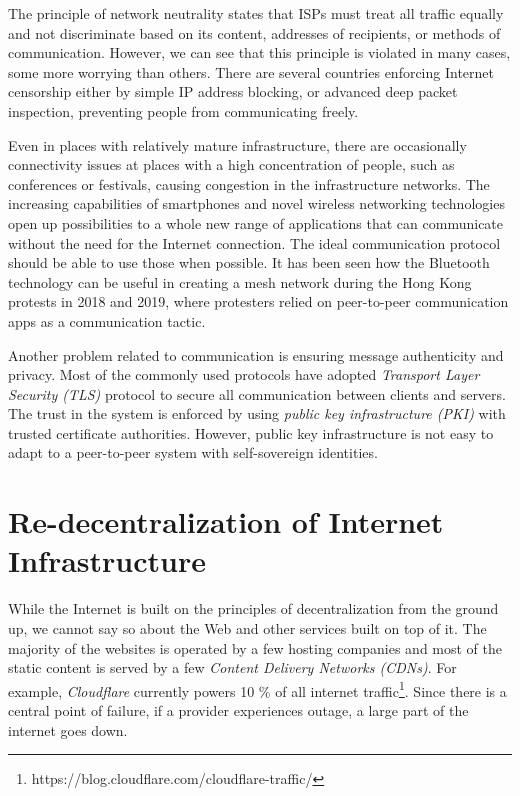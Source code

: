 The principle of network neutrality states that ISPs must treat all traffic equally and not discriminate based on its content, addresses of recipients, or methods of communication. However, we can see that this principle is violated in many cases, some more worrying than others. There are several countries enforcing Internet censorship either by simple IP address blocking, or advanced deep packet inspection, preventing people from communicating freely.

Even in places with relatively mature infrastructure, there are occasionally connectivity issues at places with a high concentration of people, such as conferences or festivals, causing congestion in the infrastructure networks. The increasing capabilities of smartphones and novel wireless networking technologies open up possibilities to a whole new range of applications that can communicate without the need for the Internet connection. The ideal communication protocol should be able to use those when possible. It has been seen how the Bluetooth technology can be useful in creating a mesh network during the Hong Kong protests in 2018 and 2019, where protesters relied on peer-to-peer communication apps as a communication tactic.

Another problem related to communication is ensuring message authenticity and privacy. Most of the commonly used protocols have adopted \textit{Transport Layer Security (TLS)} protocol to secure all communication between clients and servers. The trust in the system is enforced by using \textit{public key infrastructure (PKI)} with trusted certificate authorities. However, public key infrastructure is not easy to adapt to a peer-to-peer system with self-sovereign identities.

\iffalse
\section{Re-decentralization of Internet Infrastructure}

While the Internet is built on the principles of decentralization from the ground up, we cannot say so about the Web and other services built on top of it. The majority of the websites is operated by a few hosting companies and most of the static content is served by a few \textit{Content Delivery Networks (CDNs)}. For example, \textit{Cloudflare} currently powers 10 \% of all internet traffic\footnote{https://blog.cloudflare.com/cloudflare-traffic/}. Since there is a central point of failure, if a provider experiences outage, a large part of the internet goes down.

